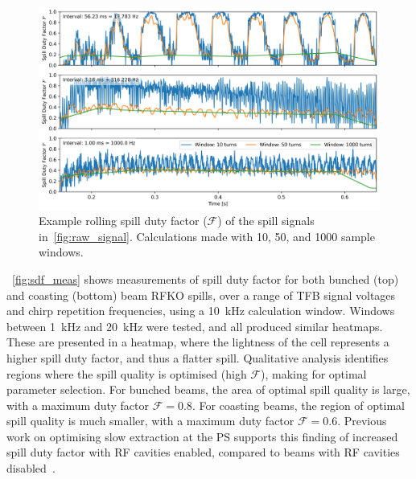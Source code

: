 \documentclass[a4paper,twoside,11pt]{report}
\begin{document}
\begin{figure}
  \centering
  \includegraphics[width=0.8\linewidth]{sdfs.png}
  \caption[Example spill duty factor calculations]{Example rolling spill duty factor ($\mathcal{F}$) of the spill signals in~\autoref{fig:raw_signal}. Calculations made with 10, 50, and 1000 sample windows.}\label{fig:sdf_example}
\end{figure}

~\autoref{fig:sdf_meas} shows measurements of spill duty factor for both bunched (top) and coasting (bottom) beam RFKO spills, over a range of TFB signal voltages and chirp repetition frequencies, using a \qty{10}{\kilo\hertz} calculation window. Windows between \qty{1}{\kilo\hertz} and \qty{20}{\kilo\hertz} were tested, and all produced similar heatmaps. These are presented in a heatmap, where the lightness of the cell represents a higher spill duty factor, and thus a flatter spill. Qualitative analysis identifies regions where the spill quality is optimised (high $\mathcal{F}$), making for optimal parameter selection. For bunched beams, the area of optimal spill quality is large, with a maximum duty factor $\mathcal{F} = 0.8$. For coasting beams, the region of optimal spill quality is much smaller, with a maximum duty factor $\mathcal{F} = 0.6$. Previous work on optimising slow extraction at the PS supports this finding of increased spill duty factor with RF cavities enabled, compared to beams with RF cavities disabled~\cite{Cappi:134321}.
\end{document}
